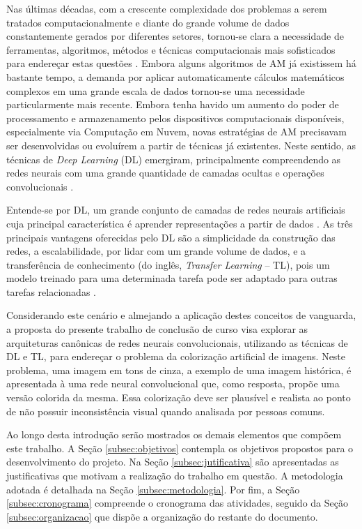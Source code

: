 Nas últimas décadas, com a crescente complexidade dos problemas a serem tratados computacionalmente e diante do grande volume de dados constantemente gerados por diferentes setores, tornou-se clara a necessidade de ferramentas, algoritmos, métodos e técnicas computacionais mais sofisticados para endereçar estas questões \cite{ref:faceli}. Embora alguns algoritmos de AM já existissem há bastante tempo, a demanda por aplicar automaticamente cálculos matemáticos complexos em uma grande escala de dados tornou-se uma necessidade particularmente mais recente. Embora tenha havido um aumento do poder de processamento e armazenamento pelos dispositivos computacionais disponíveis, especialmente via Computação em Nuvem, novas estratégias de AM precisavam ser desenvolvidas ou evoluírem a partir de técnicas já existentes. Neste sentido, as técnicas de \emph{Deep Learning} (DL) emergiram, principalmente compreendendo as redes neurais com uma grande quantidade de camadas ocultas e operações convolucionais \cite{ref:khan}.

Entende-se por DL, um grande conjunto de camadas de redes neurais artificiais cuja principal característica é aprender representações a partir de dados \cite{ref:buduma,ref:chollet}.  As três principais vantagens oferecidas pelo DL são a simplicidade da construção das redes, a escalabilidade, por lidar com um grande volume de dados, e a transferência de conhecimento (do inglês, \textit{Transfer Learning} -- TL), pois um modelo treinado para uma determinada tarefa pode ser adaptado para outras tarefas relacionadas \cite{ref:khan}.

Considerando este cenário e almejando a aplicação destes conceitos de vanguarda, a proposta do presente trabalho de conclusão de curso visa explorar as arquiteturas canônicas de redes neurais convolucionais, utilizando as técnicas de DL e TL, para endereçar o problema da colorização artificial de imagens. Neste problema, uma imagem em tons de cinza, a exemplo de uma imagem histórica, é apresentada à uma rede neural convolucional que, como resposta, propõe uma versão colorida da mesma. Essa colorização deve ser plausível e realista ao ponto de não possuir inconsistência visual quando analisada por pessoas comuns.

Ao longo desta introdução serão mostrados os demais elementos que compõem este trabalho. A Seção \ref{subsec:objetivos} contempla os objetivos propostos para o desenvolvimento do projeto. Na Seção \ref{subsec:jutificativa} são apresentadas as justificativas  que motivam a realização do trabalho em questão. A metodologia adotada é detalhada na Seção \ref{subsec:metodologia}. Por fim, a Seção \ref{subsec:cronograma}  compreende o cronograma das atividades, seguido da Seção \ref{subsec:organizacao} que dispõe a organização do restante do documento.

